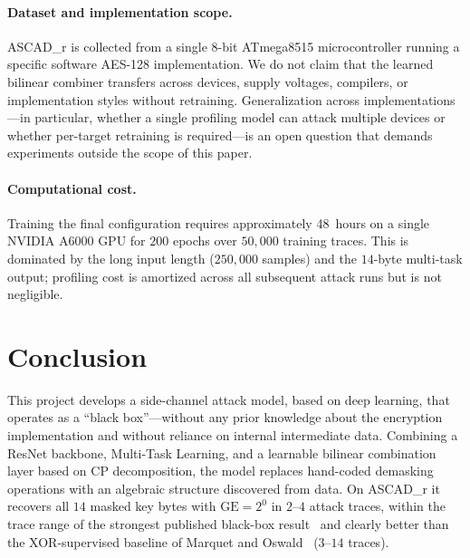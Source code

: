 \documentclass[runningheads]{llncs}
\newcommand{\GE}{\mathrm{GE}}
\begin{document}
\paragraph{Dataset and implementation scope.}
ASCAD\_r is collected from a single 8-bit ATmega8515 microcontroller running a specific software AES-128 implementation.
We do not claim that the learned bilinear combiner transfers across devices, supply voltages, compilers, or implementation styles without retraining.
Generalization across implementations---in particular, whether a single profiling model can attack multiple devices or whether per-target retraining is required---is an open question that demands experiments outside the scope of this paper.

\paragraph{Computational cost.}
Training the final configuration requires approximately 48~hours on a single NVIDIA A6000 GPU for $200$ epochs over $50{,}000$ training traces.
This is dominated by the long input length ($250{,}000$ samples) and the $14$-byte multi-task output; profiling cost is amortized across all subsequent attack runs but is not negligible.


\section{Conclusion}\label{sec:conclusion}

This project develops a side-channel attack model, based on deep learning, that operates as a ``black box''---without any prior knowledge about the encryption implementation and without reliance on internal intermediate data.
Combining a ResNet backbone, Multi-Task Learning, and a learnable bilinear combination layer based on CP decomposition, the model replaces hand-coded demasking operations with an algebraic structure discovered from data.
On ASCAD\_r it recovers all $14$ masked key bytes with $\GE = 2^{0}$ in $2$--$4$ attack traces, within the trace range of the strongest published black-box result~\cite{perin2022exploring} and clearly better than the XOR-supervised baseline of Marquet and Oswald~\cite{marquet2024exploring} ($3$--$14$ traces).
\end{document}
